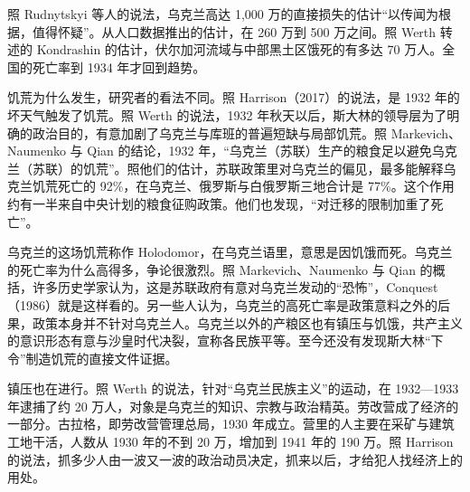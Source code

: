 照 Rudnytskyi 等人的说法，乌克兰高达 1,000 万的直接损失的估计“以传闻为根据，值得怀疑”\cite{rudnytskyi2015}。从人口数据推出的估计，在 260 万到 500 万之间\cite{rudnytskyi2015}。照 Werth 转述的 Kondrashin 的估计，伏尔加河流域与中部黑土区饿死的有多达 70 万人\cite{werth2016}。全国的死亡率到 1934 年才回到趋势\cite{mnq2021}。

饥荒为什么发生，研究者的看法不同。照 Harrison（2017）的说法，是 1932 年的坏天气触发了饥荒\cite{harrison2017}。照 Werth 的说法，1932 年秋天以后，斯大林的领导层为了明确的政治目的，有意加剧了乌克兰与库班的普遍短缺与局部饥荒\cite{werth2016}。照 Markevich、Naumenko 与 Qian 的结论，1932 年，“乌克兰（苏联）生产的粮食足以避免乌克兰（苏联）的饥荒”\cite{mnq2021}。照他们的估计，苏联政策里对乌克兰的偏见，最多能解释乌克兰饥荒死亡的 92\%，在乌克兰、俄罗斯与白俄罗斯三地合计是 77\%\cite{mnq2021}。这个作用约有一半来自中央计划的粮食征购政策\cite{mnq2021}。他们也发现，“对迁移的限制加重了死亡”\cite{mnq2021}。

乌克兰的这场饥荒称作 Holodomor，在乌克兰语里，意思是因饥饿而死\cite{mnq2021}。乌克兰的死亡率为什么高得多，争论很激烈\cite{mnq2021}。照 Markevich、Naumenko 与 Qian 的概括，许多历史学家认为，这是苏联政府有意对乌克兰发动的“恐怖”，Conquest（1986）就是这样看的\cite{mnq2021}。另一些人认为，乌克兰的高死亡率是政策意料之外的后果，政策本身并不针对乌克兰人\cite{mnq2021}。乌克兰以外的产粮区也有镇压与饥饿，共产主义的意识形态有意与沙皇时代决裂，宣称各民族平等\cite{mnq2021}。至今还没有发现斯大林“下令”制造饥荒的直接文件证据\cite{mnq2021}。

镇压也在进行。照 Werth 的说法，针对“乌克兰民族主义”的运动，在 1932—1933 年逮捕了约 20 万人，对象是乌克兰的知识、宗教与政治精英\cite{werth2016}。劳改营成了经济的一部分。古拉格，即劳改营管理总局，1930 年成立\cite{harrison2017}。营里的人主要在采矿与建筑工地干活，人数从 1930 年的不到 20 万，增加到 1941 年的 190 万\cite{harrison2017}。照 Harrison 的说法，抓多少人由一波又一波的政治动员决定，抓来以后，才给犯人找经济上的用处\cite{harrison2017}。

